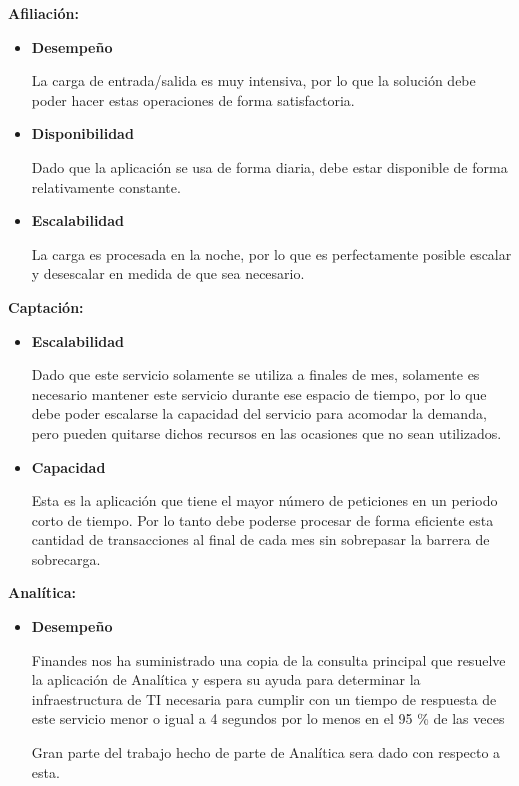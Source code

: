 \documentclass[a4paper]{article}
\begin{document}
\textbf{Afiliación:}
\begin{itemize}
    \item \textbf{Desempeño}
    
    La carga de entrada/salida es muy intensiva, por lo que la solución debe poder 
    hacer estas operaciones de forma satisfactoria.
    
    \item \textbf{Disponibilidad}
    
    Dado que la aplicación se usa de forma diaria, debe estar disponible de forma relativamente
    constante.

    \item \textbf{Escalabilidad}
    
    La carga es procesada en la noche, por lo que es perfectamente posible escalar
    y desescalar en medida de que sea necesario. 

\end{itemize}

\textbf{Captación:}
\begin{itemize}
    \item \textbf{Escalabilidad}
    
    Dado que este servicio solamente se utiliza a finales de mes, solamente es necesario mantener
    este servicio durante ese espacio de tiempo, por lo que debe poder escalarse la capacidad del 
    servicio para acomodar la demanda, pero pueden quitarse dichos recursos en las ocasiones que 
    no sean utilizados.

    \item \textbf{Capacidad}
    
    Esta es la aplicación que tiene el mayor número de peticiones en un periodo corto de
    tiempo. Por lo tanto debe poderse procesar de forma eficiente esta cantidad de transacciones
    al final de cada mes sin sobrepasar la barrera de sobrecarga.

\end{itemize}

\textbf{Analítica:}
\begin{itemize}
    \item \textbf{Desempeño}

    Finandes nos ha suministrado una copia de la consulta principal que resuelve la aplicación de Analítica y
    espera su ayuda para determinar la infraestructura de TI necesaria para cumplir con un tiempo de respuesta de
    este servicio menor o igual a 4 segundos por lo menos en el 95 \% de las veces
    
    Gran parte del trabajo hecho de parte de Analítica sera dado con respecto a esta. 
\end{itemize}
\end{document}
